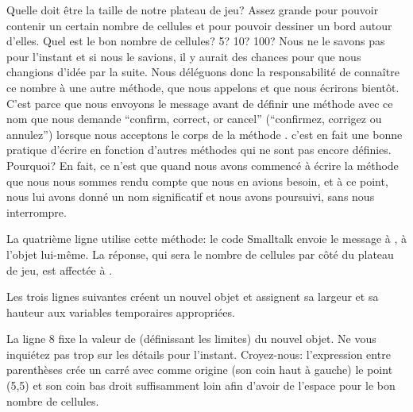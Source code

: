 \documentclass[a4paper,10pt,twoside]{book}
\begin{document}
Quelle doit \^etre la taille de notre plateau de jeu? Assez grande pour pouvoir contenir un certain nombre de cellules et pour pouvoir dessiner un bord autour d'elles.
Quel est le bon nombre de cellules? 5? 10? 100? Nous ne le savons pas
pour l'instant et si nous le savions, il y aurait des chances pour que
nous changions d'idée par la suite. Nous déléguons donc la
responsabilité de connaître ce nombre à une autre méthode, que nous
appelons  et que nous écrirons 
bient\^ot.
C'est parce que nous envoyons le message  avant de
définir une méthode avec ce nom que \pharo nous demande ``confirm,
correct, or cancel'' (\cad ``confirmez, corrigez ou annulez'') lorsque
nous acceptons le corps de la méthode \mbox{.}
c'est en fait une bonne pratique d'écrire en fonction d'autres méthodes qui ne sont pas encore définies.
Pourquoi? En fait, ce n'est que quand nous avons commencé à écrire la
méthode  que nous nous sommes rendu compte que nous en
avions besoin, et à ce point, nous lui avons donné un nom 
significatif et nous avons poursuivi, sans nous interrompre.
 
La quatrième ligne utilise cette méthode: le code Smalltalk  envoie le message  à , \cad à l'objet lui-m\^eme. La réponse, qui sera le nombre de cellules par côté du plateau de jeu, est affectée à .

Les trois lignes suivantes créent un nouvel objet  et assignent sa largeur et sa hauteur aux variables temporaires appropriées.

La ligne 8 fixe la valeur de  (définissant les limites) du nouvel objet. Ne vous inquiétez pas trop sur les détails pour l'instant. Croyez-nous: l'expression entre parenthèses crée un carré avec comme origine (\ie son coin haut à gauche) le point (5,5) et son coin bas droit suffisamment loin afin d'avoir de l'espace pour le bon nombre de cellules.
\end{document}
